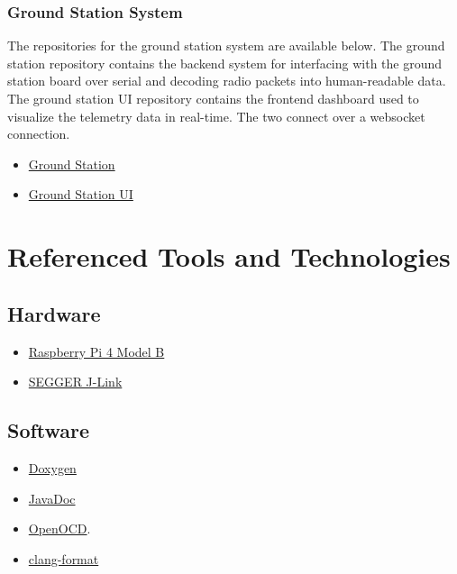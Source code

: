 \subsubsection{Ground Station System} \label{a:ground-station}

The repositories for the ground station system are available below. The ground station repository contains the backend
system for interfacing with the  ground station board over serial and decoding radio packets into
human-readable data. The ground station UI repository contains the frontend dashboard used to visualize the telemetry
data in real-time. The two connect over a websocket connection.

\begin{itemize}
    \setlength{\itemsep}{1pt}
    \setlength{\parskip}{0pt} \setlength{\parsep}{0pt}
    \item \href{https://github.com/CarletonURocketry/ground-station}{Ground Station}
    \item \href{https://github.com/CarletonURocketry/ground-station-ui}{Ground Station UI}
\end{itemize}

\section{Referenced Tools and Technologies}

\subsection{Hardware}

\begin{itemize}
    \setlength{\itemsep}{1pt}
    \setlength{\parskip}{0pt} \setlength{\parsep}{0pt}
    \item \href{https://www.raspberrypi.com/products/raspberry-pi-4-model-b/}{Raspberry Pi 4 Model B} \label{a:rpi4}
    \item \href{https://www.segger.com/downloads/jlink/}{SEGGER J-Link} \label{a:jlink}
\end{itemize}

\subsection{Software}

\begin{itemize}
    \setlength{\itemsep}{1pt}
    \setlength{\parskip}{0pt} \setlength{\parsep}{0pt}
    \item \href{https://www.doxygen.nl/index.html}{Doxygen} \label{a:doxygen}
    \item \href{https://www.doxygen.nl/manual/docblocks.html#cppblock}{JavaDoc} \label{a:javadoc}
    \item \href{https://www.segger.com/downloads/jlink/}{OpenOCD}. \label{a:openocd}
    \item \href{https://clang.llvm.org/docs/ClangFormat.html}{clang-format} \label{a:clang-format}
\end{itemize}

